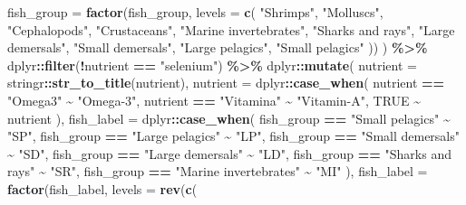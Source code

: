 \documentclass[
]{book}
\newenvironment{Shaded}{\begin{snugshade}}{\end{snugshade}}
\newcommand{\AttributeTok}[1]{\textcolor[rgb]{0.13,0.29,0.53}{#1}}
\newcommand{\ConstantTok}[1]{\textcolor[rgb]{0.56,0.35,0.01}{#1}}
\newcommand{\FunctionTok}[1]{\textcolor[rgb]{0.13,0.29,0.53}{\textbf{#1}}}
\newcommand{\NormalTok}[1]{#1}
\newcommand{\SpecialCharTok}[1]{\textcolor[rgb]{0.81,0.36,0.00}{\textbf{#1}}}
\newcommand{\StringTok}[1]{\textcolor[rgb]{0.31,0.60,0.02}{#1}}
\begin{document}
\begin{Shaded}
\begin{Highlighting}[]
    \AttributeTok{fish\_group =} \FunctionTok{factor}\NormalTok{(fish\_group, }\AttributeTok{levels =} \FunctionTok{c}\NormalTok{(}
      \StringTok{"Shrimps"}\NormalTok{, }\StringTok{"Molluscs"}\NormalTok{, }\StringTok{"Cephalopods"}\NormalTok{, }\StringTok{"Crustaceans"}\NormalTok{,}
      \StringTok{"Marine invertebrates"}\NormalTok{, }\StringTok{"Sharks and rays"}\NormalTok{, }\StringTok{"Large demersals"}\NormalTok{,}
      \StringTok{"Small demersals"}\NormalTok{, }\StringTok{"Large pelagics"}\NormalTok{, }\StringTok{"Small pelagics"}
\NormalTok{    ))}
\NormalTok{  ) }\SpecialCharTok{\%\textgreater{}\%}
\NormalTok{  dplyr}\SpecialCharTok{::}\FunctionTok{filter}\NormalTok{(}\SpecialCharTok{!}\NormalTok{nutrient }\SpecialCharTok{==} \StringTok{"selenium"}\NormalTok{) }\SpecialCharTok{\%\textgreater{}\%}
\NormalTok{  dplyr}\SpecialCharTok{::}\FunctionTok{mutate}\NormalTok{(}
    \AttributeTok{nutrient =}\NormalTok{ stringr}\SpecialCharTok{::}\FunctionTok{str\_to\_title}\NormalTok{(nutrient),}
    \AttributeTok{nutrient =}\NormalTok{ dplyr}\SpecialCharTok{::}\FunctionTok{case\_when}\NormalTok{(}
\NormalTok{      nutrient }\SpecialCharTok{==} \StringTok{"Omega3"} \SpecialCharTok{\textasciitilde{}} \StringTok{"Omega{-}3"}\NormalTok{,}
\NormalTok{      nutrient }\SpecialCharTok{==} \StringTok{"Vitamina"} \SpecialCharTok{\textasciitilde{}} \StringTok{"Vitamin{-}A"}\NormalTok{,}
      \ConstantTok{TRUE} \SpecialCharTok{\textasciitilde{}}\NormalTok{ nutrient}
\NormalTok{    ),}
    \AttributeTok{fish\_label =}\NormalTok{ dplyr}\SpecialCharTok{::}\FunctionTok{case\_when}\NormalTok{(}
\NormalTok{      fish\_group }\SpecialCharTok{==} \StringTok{"Small pelagics"} \SpecialCharTok{\textasciitilde{}} \StringTok{"SP"}\NormalTok{,}
\NormalTok{      fish\_group }\SpecialCharTok{==} \StringTok{"Large pelagics"} \SpecialCharTok{\textasciitilde{}} \StringTok{"LP"}\NormalTok{,}
\NormalTok{      fish\_group }\SpecialCharTok{==} \StringTok{"Small demersals"} \SpecialCharTok{\textasciitilde{}} \StringTok{"SD"}\NormalTok{,}
\NormalTok{      fish\_group }\SpecialCharTok{==} \StringTok{"Large demersals"} \SpecialCharTok{\textasciitilde{}} \StringTok{"LD"}\NormalTok{,}
\NormalTok{      fish\_group }\SpecialCharTok{==} \StringTok{"Sharks and rays"} \SpecialCharTok{\textasciitilde{}} \StringTok{"SR"}\NormalTok{,}
\NormalTok{      fish\_group }\SpecialCharTok{==} \StringTok{"Marine invertebrates"} \SpecialCharTok{\textasciitilde{}} \StringTok{"MI"}
\NormalTok{    ),}
    \AttributeTok{fish\_label =} \FunctionTok{factor}\NormalTok{(fish\_label, }\AttributeTok{levels =} \FunctionTok{rev}\NormalTok{(}\FunctionTok{c}\NormalTok{(}

\end{Highlighting}
\end{Shaded}
\end{document}
